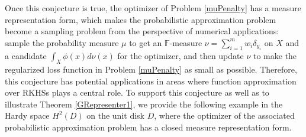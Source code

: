\documentclass{amsart}
\numberwithin{equation}{section}
\theoremstyle{plain}
\theoremstyle{remark}
\theoremstyle{definition}
\begin{document}
Once this conjecture is true, the optimizer of Problem \ref{muPenalty} has a measure representation form, which makes the probabilistic approximation problem become a sampling problem from the perspective of numerical applications: sample the probability measure $\mu$ to get an $\mathbb{F}$-measure $\nu = \sum\limits_{i=1}^m w_i \delta_{y_i}$ on $X$ and a candidate $\int_{X} \phi(x) d\nu(x)$ for the optimizer, and then update $\nu$ to make the regularized loss function in Problem \ref{muPenalty} as small as possible. Therefore, this conjecture has potential applications in areas where function approximation over RKHSs plays a central role. 
To support this conjecture as well as to illustrate Theorem \ref{GRepresenter1}, we provide the following example in the Hardy space $H^2(D)$ on the unit disk $D$, where the optimizer of the associated probabilistic approximation problem has a closed measure representation form. 
\end{document}
